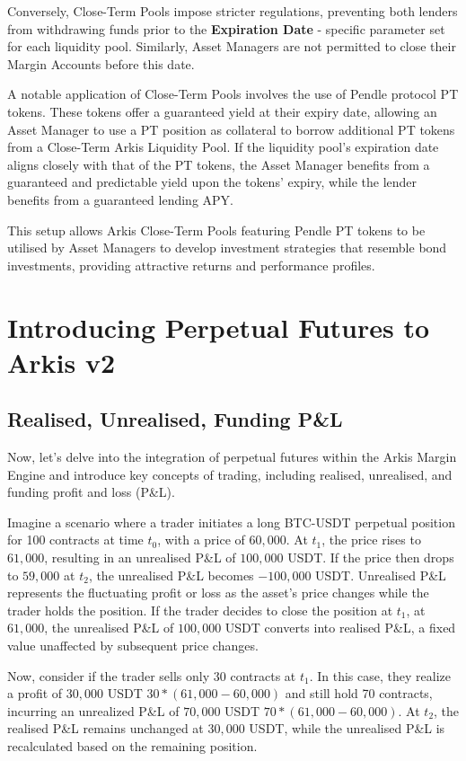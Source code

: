 \documentclass[conference]{IEEEtran}
\begin{document}
Conversely, Close-Term Pools impose stricter regulations, preventing both lenders from withdrawing funds prior to the \textbf{Expiration Date} - specific parameter set for each liquidity pool. Similarly, Asset Managers are not permitted to close their Margin Accounts before this date.

A notable application of Close-Term Pools involves the use of Pendle protocol PT tokens. These tokens offer a guaranteed yield at their expiry date, allowing an Asset Manager to use a PT position as collateral to borrow additional PT tokens from a Close-Term Arkis Liquidity Pool. If the liquidity pool’s expiration date aligns closely with that of the PT tokens, the Asset Manager benefits from a guaranteed and predictable yield upon the tokens' expiry, while the lender benefits from a guaranteed lending APY.

This setup allows Arkis Close-Term Pools featuring Pendle PT tokens to be utilised by Asset Managers to develop investment strategies that resemble bond investments, providing attractive returns and performance profiles.

\section{Introducing Perpetual Futures to Arkis v2}
\subsection{Realised, Unrealised, Funding P\&L}
Now, let’s delve into the integration of perpetual futures within the Arkis Margin Engine and introduce key concepts of trading, including realised, unrealised, and funding profit and loss (P\&L).

Imagine a scenario where a trader initiates a long BTC-USDT perpetual position for 100 contracts at time $t_{0}$, with a price of $60,000$. At $t_{1}$, the price rises to $61,000$, resulting in an unrealised P\&L of $100,000$ USDT. If the price then drops to $59,000$ at $t_{2}$, the unrealised P\&L becomes $-100,000$ USDT. Unrealised P\&L represents the fluctuating profit or loss as the asset's price changes while the trader holds the position. If the trader decides to close the position at $t_{1}$, at $61,000$, the unrealised P\&L of $100,000$ USDT converts into realised P\&L, a fixed value unaffected by subsequent price changes.

Now, consider if the trader sells only 30 contracts at $t_{1}$. In this case, they realize a profit of $30,000$ USDT $30 * (61,000 - 60,000)$ and still hold 70 contracts, incurring an unrealized P\&L of $70,000$ USDT $70 * (61,000 - 60,000)$. At $t_{2}$, the realised P\&L remains unchanged at $30,000$ USDT, while the unrealised P\&L is recalculated based on the remaining position.
\end{document}
